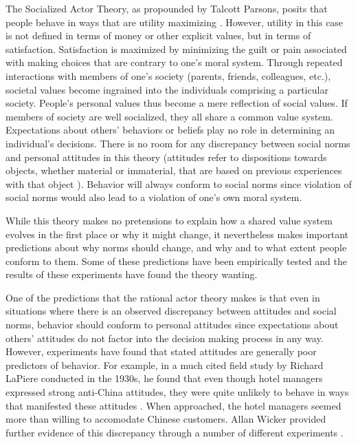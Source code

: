 \documentclass[rutwik_proposal.tex]{subfiles}
\begin{document}
The Socialized Actor Theory, as propounded by Talcott Parsons, posits that people behave in ways that are utility maximizing \cite{Parsons51}. However, utility in this case is not defined in terms of money or other explicit values, but in terms of satisfaction. Satisfaction is maximized by minimizing the guilt or pain associated with making choices that are contrary to one's moral system. Through repeated interactions with members of one's society (parents, friends, colleagues, etc.), societal values become ingrained into the individuals comprising a particular society. People's personal values thus become a mere reflection of social values. If members of society are well socialized, they all share a common value system. Expectations about others' behaviors or beliefs play no role in determining an individual's decisions. There is no room for any discrepancy between social norms and personal attitudes in this theory (attitudes refer to dispositions towards objects, whether material or immaterial, that are based on previous experiences with that object \cite{Agrawal15}). Behavior will always conform to social norms since violation of social norms would also lead to a violation of one's own moral system.

While this theory makes no pretensions to explain how a shared value system evolves in the first place or why it might change, it nevertheless makes important predictions about why norms should change, and why and to what extent people conform to them. Some of these predictions have been empirically tested and the results of these experiments have found the theory wanting.

One of the predictions that the rational actor theory makes is that even in situations where there is an observed discrepancy between attitudes and social norms, behavior should conform to personal attitudes since expectations about others' attitudes do not factor into the decision making process in any way. However, experiments have found that stated attitudes are generally poor predictors of behavior. For example, in a much cited field study by Richard LaPiere conducted in the 1930s, he found that even though hotel managers expressed strong anti-China attitudes, they were quite unlikely to behave in ways that manifested these attitudes \cite{LaPiere34}. When approached, the hotel managers seemed more than willing to accomodate Chinese customers. Allan Wicker provided further evidence of this discrepancy through a number of different experiments \cite{Wicker69}.
\end{document}
